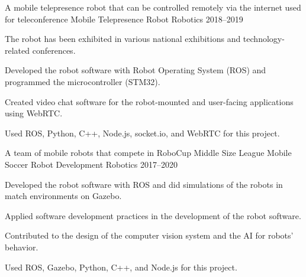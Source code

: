 

\begin{cventries}
	\cventry
	{A mobile telepresence robot that can be controlled remotely via the internet used for teleconference} %
	{Mobile Telepresence Robot} %
	{Robotics} %
	{2018--2019} %
	{
		\begin{cvitems} %
			\item {The robot has been exhibited in various national exhibitions and technology-related conferences.}
			\item {Developed the robot software with Robot Operating System (ROS) and programmed the microcontroller (STM32).}
			\item {Created video chat software for the robot-mounted and user-facing applications using WebRTC.}
			\item {Used ROS, Python, C++, Node.js, socket.io, and WebRTC for this project.}
		\end{cvitems}
	}
    
    \cventry
    {A team of mobile robots that compete in RoboCup Middle Size League} %
    {Mobile Soccer Robot Development} %
    {Robotics} %
    {2017--2020} %
    {
    	\begin{cvitems} %
    		\item {Developed the robot software with ROS and did simulations of the robots in match environments on Gazebo.}
    		\item {Applied software development practices in the development of the robot software.}
    		\item {Contributed to the design of the computer vision system and the AI for robots' behavior.}
    		\item {Used ROS, Gazebo, Python, C++, and Node.js for this project.}
    	\end{cvitems}
    }
    

\end{cventries}
